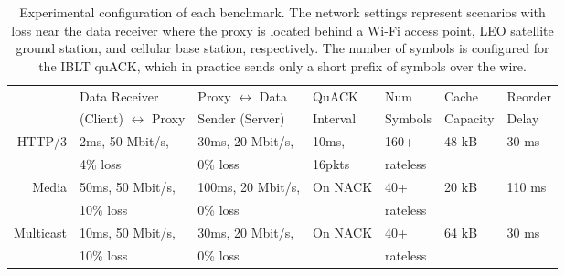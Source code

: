 \begin{table*}
    \centering
    \begin{tabular}{r l l l l l l}
        \toprule
        \bf
        & Data Receiver & Proxy $\leftrightarrow$ Data & QuACK & Num & Cache & Reorder \\
        & (Client) $\leftrightarrow$ Proxy & Sender (Server) &  Interval & Symbols & Capacity & Delay \\
        \midrule
         HTTP/3 & 2ms, 50 Mbit/s, & 30ms, 20 Mbit/s, & 10ms, & 160+ & 48 kB & 30 ms \\
         & 4\% loss & 0\% loss & 16pkts & rateless & & \\
         Media & 50ms, 50 Mbit/s, & 100ms, 20 Mbit/s, & On NACK & 40+ & 20 kB & 110 ms \\
         & 10\% loss & 0\% loss & & rateless & & \\
         Multicast & 10ms, 50 Mbit/s, & 30ms, 20 Mbit/s, & On NACK & 40+ & 64 kB & 30 ms \\
         & 10\% loss & 0\% loss & & rateless & & \\
         \bottomrule
    \end{tabular}
    \caption{Experimental configuration of each benchmark. The network settings
     represent scenarios with loss near the data receiver where the proxy is
     located behind a Wi-Fi access point, LEO satellite ground station, and
     cellular base station, respectively. The number of symbols is configured
     for the IBLT quACK, which in practice sends only a short prefix of symbols
     over the wire.
     }
    \label{tab:packrat:experiment-config}
\end{table*}